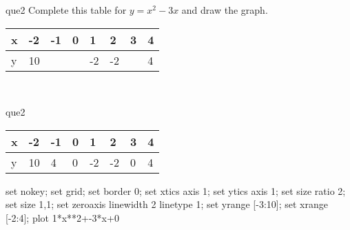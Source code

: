 \documentclass[13.5pt, varwidth=true]{beamer}
\begin{document}
\begin{frame}[shrink=19,fragile]
	\begin{beamercolorbox}[rounded=true, left, shadow=true,wd=14.8cm]{que2}
		 Complete this table for $y = x^{2} - 3x$ and draw the graph. \\[0.3cm] \renewcommand{\arraystretch}{1.2}\begin{tabular}{|C|C|C|C|C|C|C|C|} \hline x & -2 & -1 & 0 & 1 & 2 & 3 & 4 \\ \hline y & 10 &  &  & -2 & -2 &  & 4\\ \hline \end{tabular}\\[0.3cm]
	\end{beamercolorbox}
\end{frame}
\begin{frame}[shrink=19,fragile]
	\begin{beamercolorbox}[rounded=true, left, shadow=true,wd=14.8cm]{que2}
		\renewcommand{\arraystretch}{1.2}\begin{tabular}{|C|C|C|C|C|C|C|C|} \hline x & -2 & -1 & 0 & 1 & 2 & 3 & 4 \\ \hline y & 10 & 4 & 0 & -2 & -2 & 0 & 4\\ \hline \end{tabular}\begin{gnuplot}[terminal=pdf] set nokey; set grid; set border 0; set xtics axis 1; set ytics axis 1; set size ratio 2; set size 1,1; set zeroaxis linewidth 2 linetype 1; set yrange [-3:10]; set xrange [-2:4]; plot 1*x**2+-3*x+0 \end{gnuplot}
	\end{beamercolorbox}
\end{frame}
\end{document}
